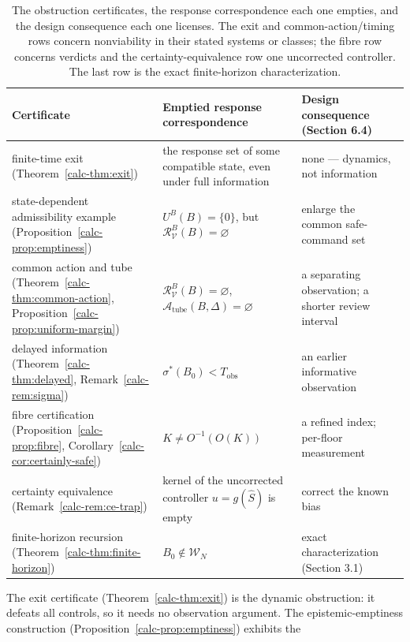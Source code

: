 \documentclass[10pt,twocolumn]{article}
\theoremstyle{definition}
\begin{document}
\begin{table}[t]
\centering
\footnotesize
\begin{tabular}{@{}l>{\raggedright\arraybackslash}p{3.4cm}>{\raggedright\arraybackslash}p{4.4cm}@{}}
\toprule
Certificate & Emptied response correspondence & Design consequence (Section 6.4) \\
\midrule
finite-time exit (Theorem~\ref{calc-thm:exit}) & the response set of some compatible state, even under full information & none --- dynamics, not information \\
state-dependent admissibility example (Proposition~\ref{calc-prop:emptiness}) & \(U^B(B)=\{0\}\), but \(\mathcal R_{\mathcal V}^B(B)=\varnothing\) & enlarge the common safe-command set \\
common action and tube (Theorem~\ref{calc-thm:common-action}, Proposition~\ref{calc-prop:uniform-margin}) & \(\mathcal{R}_{\mathcal{V}}^B(B)=\varnothing\), \(\mathcal{A}_{\mathrm{tube}}(B,\Delta)=\varnothing\) & a separating observation; a shorter review interval \\
delayed information (Theorem~\ref{calc-thm:delayed}, Remark~\ref{calc-rem:sigma}) & \(\sigma^*(B_0)<T_{\mathrm{obs}}\) & an earlier informative observation \\
fibre certification (Proposition~\ref{calc-prop:fibre}, Corollary~\ref{calc-cor:certainly-safe}) & \(K\neq O^{-1}(O(K))\) & a refined index; per-floor measurement \\
certainty equivalence (Remark~\ref{calc-rem:ce-trap}) & kernel of the uncorrected controller \(u=g(\hat S)\) is empty & correct the known bias \\
finite-horizon recursion (Theorem~\ref{calc-thm:finite-horizon}) & \(B_0\notin\mathcal{W}_N\) & exact characterization (Section 3.1) \\
\bottomrule
\end{tabular}
\caption{The obstruction certificates, the response correspondence each one empties, and the design consequence each one licenses. The exit and common-action/timing rows concern nonviability in their stated systems or classes; the fibre row concerns verdicts and the certainty-equivalence row one uncorrected controller. The last row is the exact finite-horizon characterization.}
\label{calc-tab:summary}
\end{table} The exit certificate (Theorem~\ref{calc-thm:exit}) is the
dynamic obstruction: it defeats all controls, so it needs no observation
argument. The epistemic-emptiness construction (Proposition~\ref{calc-prop:emptiness}) exhibits the
\end{document}
